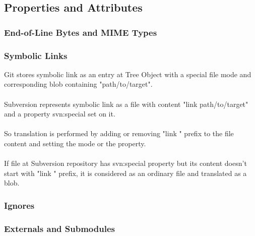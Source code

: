 \subsection{Properties and Attributes}
\subsubsection{End-of-Line Bytes and MIME Types}
\subsubsection{Symbolic Links}
Git stores symbolic link as an entry at Tree Object with a special file mode and corresponding blob containing "path/to/target".
\\\\
Subversion represents symbolic link as a file with content "link path/to/target" and a property svn:special set on it.
\\\\
So translation is performed by adding or removing "link " prefix to the file content and setting the mode or the property.
\\\\
If file at Subversion repository has svn:special property but its content doesn't start with "link " prefix, it is considered as an ordinary file and translated as a blob.
\subsubsection{Ignores}
\subsubsection{Externals and Submodules}